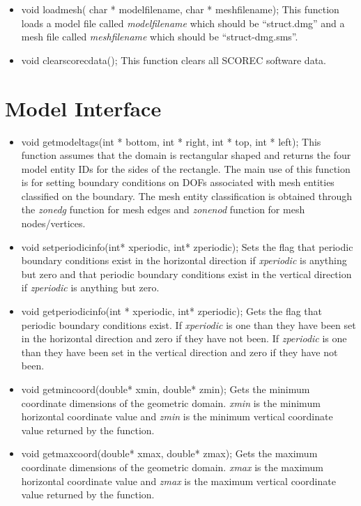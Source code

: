 \begin{itemize}
\item void loadmesh( char * modelfilename, char * meshfilename); This function
loads a model file called \textit{modelfilename} which should be ``struct.dmg'' 
and a mesh file called \textit{meshfilename} which should be ``struct-dmg.sms''.
\item void clearscorecdata(); This function clears all SCOREC software data.
\end{itemize}


\section{Model Interface}
\begin{itemize}
\item  void getmodeltags(int * bottom, int * right, int * top, int * left); This
function assumes that the domain is rectangular shaped and returns the four model entity 
IDs for the sides of the rectangle.  The main use of this function is for setting boundary 
conditions on DOFs associated with mesh entities classified on the boundary.  The mesh entity
classification is obtained through the \textit{zonedg} function 
for mesh edges and \textit{zonenod} function for
mesh nodes/vertices.
\item  void setperiodicinfo(int* xperiodic, int* zperiodic); Sets the flag that periodic
boundary conditions exist in the horizontal direction if \textit{xperiodic} is anything but zero
and that periodic
boundary conditions exist in the vertical direction if \textit{zperiodic} is anything but zero.
\item  void getperiodicinfo(int * xperiodic, int* zperiodic);	Gets the flag that periodic
boundary conditions exist.  If \textit{xperiodic} is one than they have been set in
the horizontal direction and zero if they have not been. If
 \textit{zperiodic} is one than they have been set in
the vertical direction and zero if they have not been.
\item  void getmincoord(double* xmin, double* zmin); Gets the minimum coordinate dimensions of the geometric domain. 
\textit{xmin} is the minimum horizontal coordinate value and \textit{zmin} is the minimum vertical coordinate value
returned by the function.
\item  void getmaxcoord(double* xmax, double* zmax); Gets the maximum coordinate dimensions of the geometric domain.  
\textit{xmax} is the maximum horizontal coordinate value and \textit{zmax} is the maximum vertical coordinate value
returned by the function.
\end{itemize}

